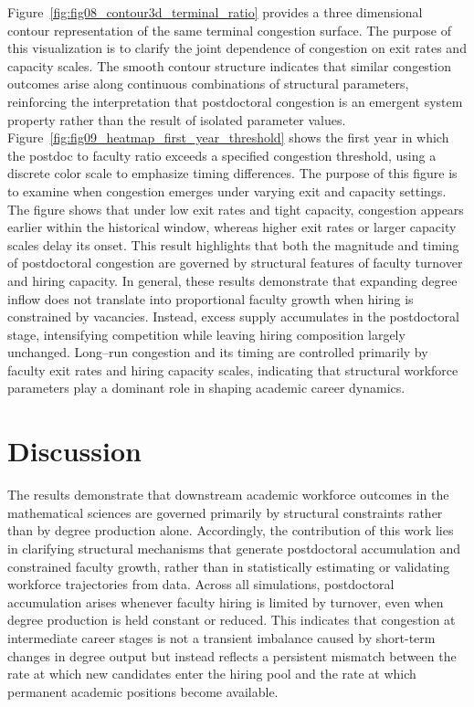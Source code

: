\documentclass[3p]{elsarticle}%
\theoremstyle{definition}
\begin{document}
 \noindent Figure~\ref{fig:fig08_contour3d_terminal_ratio} provides a three dimensional contour representation of the same terminal congestion surface. The purpose of this visualization is to clarify the joint dependence of congestion on exit rates and capacity scales. The smooth contour structure indicates that similar congestion outcomes arise along continuous combinations of structural parameters, reinforcing the interpretation that postdoctoral congestion is an emergent system property rather than the result of isolated parameter values. Figure~\ref{fig:fig09_heatmap_first_year_threshold} shows the first year in which the postdoc to faculty ratio exceeds a specified congestion threshold, using a discrete color scale to emphasize timing differences. The purpose of this figure is to examine when congestion emerges under varying exit and capacity settings. The figure shows that under low exit rates and tight capacity, congestion appears earlier within the historical window, whereas higher exit rates or larger capacity scales delay its onset. This result highlights that both the magnitude and timing of postdoctoral congestion are governed by structural features of faculty turnover and hiring capacity. In general, these results demonstrate that expanding degree inflow does not translate into proportional faculty growth when hiring is constrained by vacancies. Instead, excess supply accumulates in the postdoctoral stage, intensifying competition while leaving hiring composition largely unchanged. Long--run congestion and its timing are controlled primarily by faculty exit rates and hiring capacity scales, indicating that structural workforce parameters play a dominant role in shaping academic career dynamics.

\section{Discussion}\label{sec4}
 \noindent The results demonstrate that downstream academic workforce outcomes in the mathematical sciences are governed primarily by structural constraints rather than by degree production alone. Accordingly, the contribution of this work lies in clarifying structural mechanisms that generate postdoctoral accumulation and constrained faculty growth, rather than in statistically estimating or validating workforce trajectories from data.
 Across all simulations, postdoctoral accumulation arises whenever faculty hiring is limited by turnover, even when degree production is held constant or reduced. This indicates that congestion at intermediate career stages is not a transient imbalance caused by short-term changes in degree output but instead reflects a persistent mismatch between the rate at which new candidates enter the hiring pool and the rate at which permanent academic positions become available. \\ 
 
\end{document}
